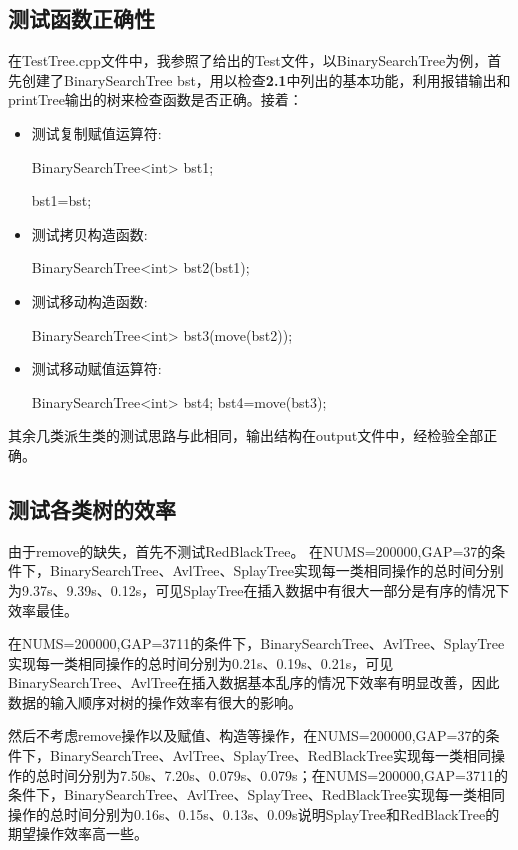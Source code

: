 \documentclass[UTF8]{ctexart}
\begin{document}
\subsection{测试函数正确性}
在TestTree.cpp文件中，我参照了给出的Test文件，以BinarySearchTree为例，首先创建了BinarySearchTree bst，用以检查\textbf{2.1}中列出的基本功能，利用报错输出和printTree输出的树来检查函数是否正确。接着：\par
\begin{itemize}
    \item 测试复制赋值运算符:
    \begin{flushleft}
    BinarySearchTree<int> bst1;\par
    bst1=bst;
\end{flushleft}
    \item 测试拷贝构造函数:
    \begin{flushleft}
    BinarySearchTree<int> bst2(bst1);
    \end{flushleft}
    \item 测试移动构造函数:
    \begin{flushleft}
    BinarySearchTree<int> bst3(move(bst2));
    \end{flushleft}
    \item 测试移动赋值运算符:
    \begin{flushleft}
    BinarySearchTree<int> bst4;
    bst4=move(bst3);
    \end{flushleft}
    \end{itemize}
其余几类派生类的测试思路与此相同，输出结构在output文件中，经检验全部正确。
\subsection{测试各类树的效率}
由于remove的缺失，首先不测试RedBlackTree。
在NUMS=200000,GAP=37的条件下，BinarySearchTree、AvlTree、SplayTree实现每一类相同操作的总时间分别为9.37s、9.39s、0.12s，可见SplayTree在插入数据中有很大一部分是有序的情况下效率最佳。\par
在NUMS=200000,GAP=3711的条件下，BinarySearchTree、AvlTree、SplayTree实现每一类相同操作的总时间分别为0.21s、0.19s、0.21s，可见BinarySearchTree、AvlTree在插入数据基本乱序的情况下效率有明显改善，因此数据的输入顺序对树的操作效率有很大的影响。\par
然后不考虑remove操作以及赋值、构造等操作，在NUMS=200000,GAP=37的条件下，BinarySearchTree、AvlTree、SplayTree、RedBlackTree实现每一类相同操作的总时间分别为7.50s、7.20s、0.079s、0.079s；在NUMS=200000,GAP=3711的条件下，BinarySearchTree、AvlTree、SplayTree、RedBlackTree实现每一类相同操作的总时间分别为0.16s、0.15s、0.13s、0.09s说明SplayTree和RedBlackTree的期望操作效率高一些。
\end{document}
